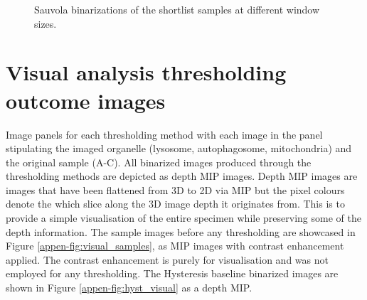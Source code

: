 \begin{figure}[hb!]
	\caption{Sauvola binarizations of the shortlist samples at different window sizes.}
	
\end{figure}


\chapter{Visual analysis thresholding outcome images}
\makeatletter{}\makeatother
\label{appen:visual_full_set}
Image panels for each thresholding method with each image in the panel stipulating the imaged organelle (lysosome, autophagosome, mitochondria) and the original sample (A-C). All binarized images produced through the thresholding methods are depicted as depth MIP images. Depth MIP images are images that have been flattened from 3D to 2D via MIP but the pixel colours denote the which slice along the 3D image depth it originates from. This is to provide a simple visualisation of the entire specimen while preserving some of the depth information. The sample images before any thresholding are showcased in Figure \ref{appen-fig:visual_samples}, as MIP images with contrast enhancement applied. The contrast enhancement is purely for visualisation and was not employed for any thresholding. The Hysteresis baseline binarized images are shown in Figure \ref{appen-fig:hyst_visual} as a depth MIP.

